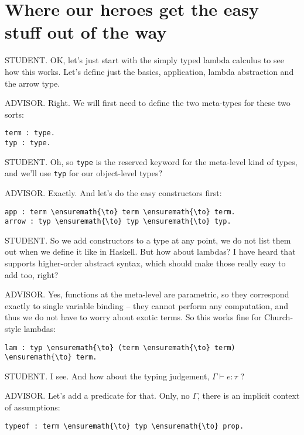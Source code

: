 \section{Where our heroes get the easy stuff out of the
way}\label{where-our-heroes-get-the-easy-stuff-out-of-the-way}

STUDENT. OK, let's just start with the simply typed lambda calculus to
see how this works. Let's define just the basics, application, lambda
abstraction and the arrow type.

ADVISOR. Right. We will first need to define the two meta-types for
these two sorts:

\begin{verbatim}
term : type.
typ : type.
\end{verbatim}

STUDENT. Oh, so \texttt{type} is the reserved keyword for the meta-level
kind of types, and we'll use \texttt{typ} for our object-level types?

ADVISOR. Exactly. And let's do the easy constructors first:

\begin{verbatim}
app : term \ensuremath{\to} term \ensuremath{\to} term.
arrow : typ \ensuremath{\to} typ \ensuremath{\to} typ.
\end{verbatim}

STUDENT. So we add constructors to a type at any point, we do not list
them out when we define it like in Haskell. But how about lambdas? I
have heard that \lamprolog supports higher-order abstract syntax, which
should make those really easy to add too, right?

ADVISOR. Yes, functions at the meta-level are parametric, so they
correspond exactly to single variable binding -- they cannot perform any
computation, and thus we do not have to worry about exotic terms. So
this works fine for Church-style lambdas:

\begin{verbatim}
lam : typ \ensuremath{\to} (term \ensuremath{\to} term) \ensuremath{\to} term.
\end{verbatim}

STUDENT. I see. And how about the typing judgement,
\(\Gamma \vdash e : \tau\) ?

ADVISOR. Let's add a predicate for that. Only, no \(\Gamma\), there is
an implicit context of assumptions:

\begin{verbatim}
typeof : term \ensuremath{\to} typ \ensuremath{\to} prop.
\end{verbatim}


